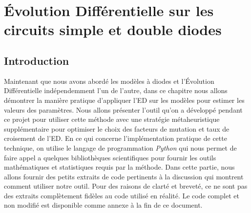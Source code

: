 \chapter{Évolution Différentielle sur les circuits simple et double diodes}

\section{Introduction}
Maintenant que nous avons abordé les modèles à diodes et l'Évolution Différentielle indépendemment l'un de l'autre, dans ce chapitre nous allons démontrer la manière pratique d'appliquer l'ED  sur les modèles pour estimer les valeurs des paramètres. Nous allons présenter l'outil qu'on a développé pendant ce projet pour utiliser cette méthode avec une stratégie métaheuristique supplémentaire pour optimiser le choix des facteurs de mutation et taux de croisement de l'ED. En ce qui concerne l'implémentation pratique de cette technique, on utilise le langage de programmation \textit{Python} qui nous permet de faire appel a quelques bibliothèques scientifiques pour fournir les outils mathématiques et statistiques requis par la méthode. Dans cette partie, nous allons fournir des petits extraits de code pertinents à la discussion qui montrent comment utiliser notre outil. Pour des raisons de clarté et breveté, ce ne sont pas des extraits complètement fidèles au code utilisé en réalité. Le code complet et non modifié est disponible comme annexe à la fin de ce document. 

